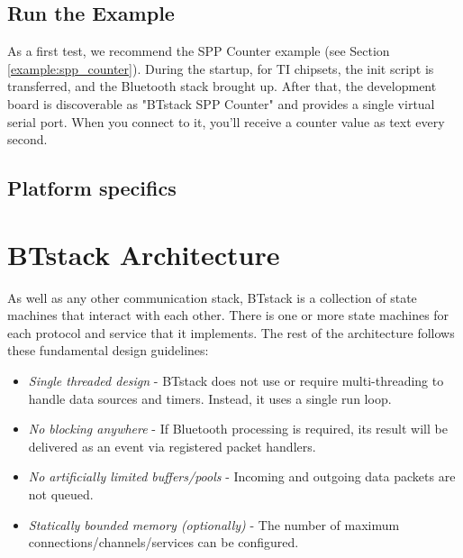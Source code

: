 \documentclass[a4paper,titlepage,oneside,12pt]{amsart} %
\begin{document}
\subsection{Run the Example}

As a first test, we recommend the SPP Counter example (see Section \ref{example:spp_counter}). During the startup, for TI chipsets, the init script is transferred, and the Bluetooth stack brought up. After that, the development board is discoverable as "BTstack SPP Counter" and provides a single virtual serial port. When you connect to it, you'll receive a counter value as text every second.

 
\subsection{Platform specifics}
 



\section{BTstack Architecture}

As well as any other communication stack, BTstack is a collection of state machines that interact with each other. There is one or more state machines for each protocol and service that it implements. The rest of the architecture follows these fundamental design guidelines:

\begin{itemize}
\item \emph{Single threaded design} - BTstack does not use or require multi-threading to handle data sources and timers. Instead, it uses a single run loop.
\item \emph{No blocking anywhere} - If Bluetooth processing is required, its result will be delivered as an event via registered packet handlers.
\item \emph{No artificially limited buffers/pools} - Incoming and outgoing data packets are not queued.
\item \emph{Statically bounded memory (optionally)} - The number of maximum connections/channels/services can be configured.
\end{itemize}
\end{document}
